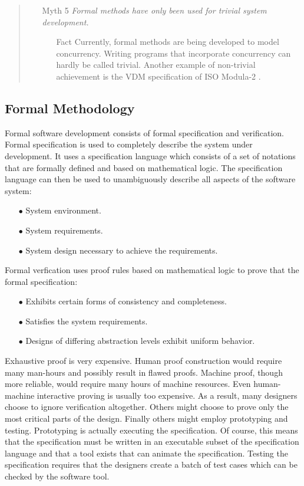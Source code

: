 \documentclass[11pt]{article}
\begin{document}
\begin{quote}
\begin{itemize}
\begin{itemize}
\end{itemize}
\item[Myth 5]{\it Formal methods have only been used for trivial system development.}
\begin{itemize}
\item[Fact]Currently, formal methods are being developed to model concurrency.  Writing programs that incorporate concurrency can hardly be called trivial.  Another example of non-trivial achievement is the VDM specification of ISO Modula-2 \cite{M2}.
\end{itemize}
\end{itemize}
\end{quote}

\subsection{Formal Methodology}

Formal software development consists of formal specification and verification.  Formal specification is used to completely describe the system under development.  It uses a specification language which consists of a set of notations that are formally defined and based on mathematical logic.  The specification language can then be used to unambiguously describe all aspects of the software system:
\begin{itemize}
\item[$\bullet$]System environment.
\item[$\bullet$]System requirements.
\item[$\bullet$]System design necessary to achieve the requirements.
\end{itemize}
Formal verfication uses proof rules based on mathematical logic to prove that the formal specification:
\begin{itemize}
\item[$\bullet$]Exhibits certain forms of consistency and completeness.
\item[$\bullet$]Satisfies the system requirements.
\item[$\bullet$]Designs of differing abstraction levels exhibit uniform behavior.\cite{BRJS}
\end{itemize}

Exhaustive proof is very expensive.  Human proof construction would require many man-hours and possibly result in flawed proofs.  Machine proof, though more reliable, would require many hours of machine resources.  Even human-machine interactive proving is usually too expensive.  As a result, many designers choose to ignore verification altogether.  Others might choose to prove only the most critical parts of the design.  Finally others might employ prototyping and testing.  Prototyping is actually executing the specification.  Of course, this means that the specification must be written in an executable subset of the specification language and that a tool exists that can animate the specification.  Testing the specification requires that the designers create a batch of
test cases which can be checked by the software tool.
\end{document}
